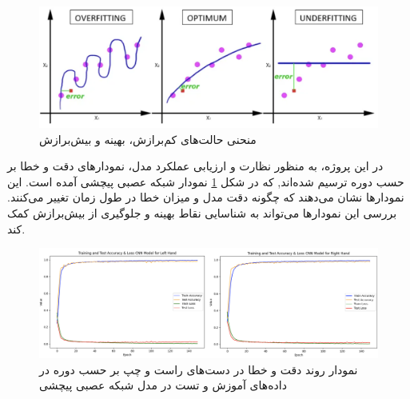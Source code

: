 \begin{figure}[h]
    \centering
    \includegraphics[width=1\textwidth]{fitting.png}
    \caption[منحنی‌ حالت‌های کم‌برازش، بهینه و بیش‌برازش]{منحنی‌ حالت‌های کم‌برازش، بهینه و بیش‌برازش \cite{wwwreddi92:online}}
\end{figure}


در این پروژه، به منظور نظارت و ارزیابی عملکرد مدل، نمودارهای دقت و خطا بر حسب دوره ترسیم شده‌اند, که در شکل \ref{acc} نمودار شبکه عصبی پیچشی آمده‌ است. این نمودارها نشان می‌دهند که چگونه دقت مدل و میزان خطا در طول زمان تغییر می‌کنند. بررسی این نمودارها می‌تواند به شناسایی نقاط بهینه و جلوگیری از بیش‌برازش کمک کند.





\begin{figure}[h]
    \centering
    \includegraphics[width=1\textwidth]{Chart_CNN.png}
    \caption{نمودار روند دقت و خطا در دست‌های راست و چپ بر حسب دوره در داده‌های آموزش و تست در مدل شبکه عصبی پیچشی}
    \label{acc}
\end{figure}



